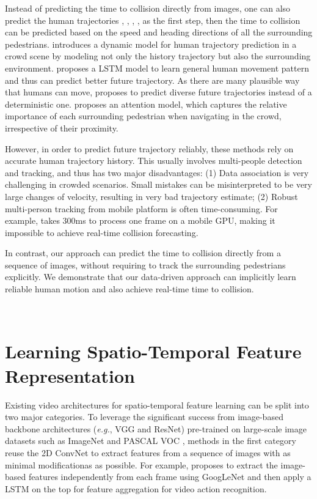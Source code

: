 Instead of predicting the time to collision directly from images, one can also predict the human trajectories \cite{socialGAN}, \cite{socialLSTM}, \cite{anirudh}, \cite{2009YoullNW}, \cite{ziebart2009planning} as the first step, then the time to collision can be predicted based on the speed and heading directions of all the surrounding pedestrians.
\cite{2009YoullNW} introduces a dynamic model for human trajectory prediction in a crowd scene by modeling not only the history trajectory but also the surrounding environment. \cite{socialLSTM} proposes a LSTM model to learn general human movement pattern and thus can predict better future trajectory. As there are many plausible way that humans can move, \cite{socialGAN} proposes to predict diverse future trajectories instead of a deterministic one. \cite{anirudh} proposes an attention model, which captures the relative importance of each surrounding pedestrian when navigating in the crowd, irrespective of their proximity.


However, in order to predict future trajectory reliably, these methods rely on accurate human trajectory history. This usually involves multi-people detection and tracking, and thus has two major disadvantages: (1) Data association is very challenging in crowded scenarios. Small mistakes can be misinterpreted to be very large changes of velocity, resulting in very bad trajectory estimate; (2) Robust multi-person tracking from mobile platform is often time-consuming. For example, \cite{Andreas} takes 300ms to process one frame on a mobile GPU, making it impossible to achieve real-time collision forecasting. 

In contrast, our approach can predict the time to collision directly from a sequence of images, without requiring to track the surrounding pedestrians explicitly. We demonstrate that our data-driven approach can implicitly learn reliable human motion and also achieve real-time time to collision.


\noindent\\
\section{Learning Spatio-Temporal Feature Representation}

Existing video architectures for spatio-temporal feature learning can be split into two major categories. To leverage the significant success from image-based backbone architectures (\emph{e.g.}, VGG and ResNet) pre-trained on large-scale image datasets such as ImageNet \cite{imagenet} and PASCAL VOC \cite{pascalVOC}, methods in the first category reuse the 2D ConvNet to extract features from a sequence of images with as minimal modificationas as possible. For example, \cite{BeyondSS} proposes to extract the image-based features independently from each frame using GoogLeNet and then apply a LSTM \cite{lstm} on the top for feature aggregation for video action recognition.

